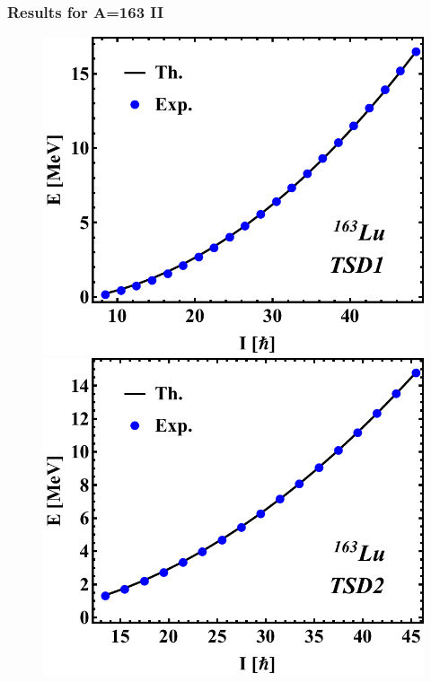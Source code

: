 \documentclass{beamer}
\begin{document}
\begin{frame}
  \frametitle{Results for A=163 II}
  \begin{figure}
    \centering
    \begin{minipage}{.5\textwidth}
      \centering
      \includegraphics[scale=0.3]{figs/DoubleShift_TSD1.pdf}
      \includegraphics[scale=0.3]{figs/DoubleShift_TSD2.pdf}
    \end{minipage}%
    \begin{minipage}{.5\textwidth}
      \centering

\end{minipage}
\end{figure}
\end{frame}
\end{document}
